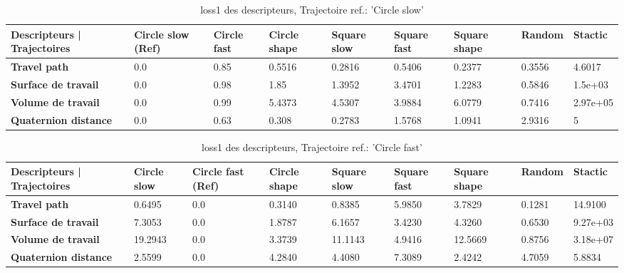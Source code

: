 \documentclass[5pt]{article}
\begin{document}
\begin{table}[H]
    \centering
    \begin{tabularx}{\textwidth}{|p{}|X|X|X|X|X|X|X|X|}
    \rowcolor{lightgray}
        \hline
        Descripteurs | Trajectoires & \cellcolor[HTML]{238CCC} \textbf{Circle slow (Ref)} & Circle fast & Circle shape & Square slow & Square fast & Square shape & Random & Stactic \\ \hline
        \textbf{Travel path} & 0.0 & 0.85 & 0.5516 & 0.2816 & 0.5406 & 0.2377 & 0.3556 & 4.6017 \\ \hline
        \textbf{Surface de travail} & 0.0 & 0.98 & 1.85 & 1.3952 & 3.4701 & 1.2283 & 0.5846 & 1.5e+03 \\ \hline
        \textbf{Volume de travail} & 0.0 & 0.99 & 5.4373 & 4.5307 & 3.9884 & 6.0779 & 0.7416 & 2.97e+05 \\ \hline
        \textbf{Quaternion distance} & 0.0 & 0.63 & 0.308 & 0.2783 & 1.5768 & 1.0941 & 2.9316 & 5 \\ \hline  
    \end{tabularx}
    \caption{loss1 des descripteurs, Trajectoire ref.: 'Circle slow'}
\end{table}
 
 \begin{table}[H]
    \centering
    \begin{tabularx}{\textwidth}{|p{}|X|X|X|X|X|X|X|X|}
    \rowcolor{lightgray}
        \hline
        Descripteurs | Trajectoires &  Circle slow & \cellcolor[HTML]{238CCC}\textbf{Circle fast (Ref)} & Circle shape & Square slow & Square fast & Square shape & Random & Stactic \\ \hline
        \textbf{Travel path} & 0.6495 & 0.0 & 0.3140 & 0.8385 & 5.9850 & 3.7829 & 0.1281 & 14.9100 \\ \hline
        \textbf{Surface de travail} & 7.3053 & 0.0 & 1.8787 & 6.1657 & 3.4230 & 4.3260 & 0.6530 & 9.27e+03 \\ \hline
        \textbf{Volume de travail} & 19.2943 & 0.0 & 3.3739 & 11.1143 & 4.9416 & 12.5669 & 0.8756 & 3.18e+07 \\ \hline
        \textbf{Quaternion distance} & 2.5599 & 0.0 & 4.2840 & 4.4080 & 7.3089 & 2.4242 & 4.7059 & 5.8834 \\ \hline  
    \end{tabularx}
        \caption{loss1 des descripteurs, Trajectoire ref.: 'Circle fast'}

\end{table}
\end{document}
